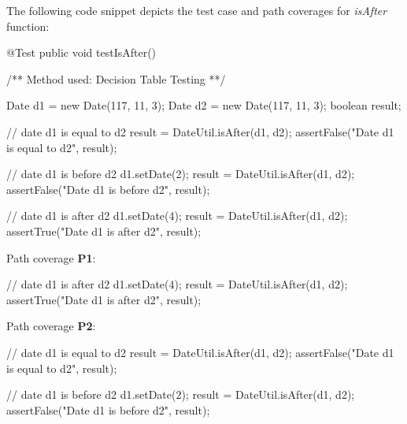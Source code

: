 \documentclass[fontsize=12pt,paper=letter,twoside]{scrartcl}
\begin{document}
\noindent The following code snippet depicts the test case and path coverages for \emph{isAfter} function:
\begin{code}
	@Test
	public void testIsAfter() {
		/** Method used: Decision Table Testing **/
		
		Date d1 = new Date(117, 11, 3);
		Date d2 = new Date(117, 11, 3);
		boolean result;
		
		// date d1 is equal to d2
		result = DateUtil.isAfter(d1, d2);
		assertFalse("Date d1 is equal to d2", result);
		
		// date d1 is before d2
		d1.setDate(2);
		result = DateUtil.isAfter(d1, d2);
		assertFalse("Date d1 is before d2", result);
		
		// date d1 is after d2
		d1.setDate(4);
		result = DateUtil.isAfter(d1, d2);
		assertTrue("Date d1 is after d2", result);
	}
\end{code}

\newpage
\noindent Path coverage \textbf{P1}:
\begin{code}
		// date d1 is after d2
		d1.setDate(4);
		result = DateUtil.isAfter(d1, d2);
		assertTrue("Date d1 is after d2", result);
\end{code}

\noindent Path coverage \textbf{P2}:
\begin{code}
		// date d1 is equal to d2
		result = DateUtil.isAfter(d1, d2);
		assertFalse("Date d1 is equal to d2", result);
		
		// date d1 is before d2
		d1.setDate(2);
		result = DateUtil.isAfter(d1, d2);
		assertFalse("Date d1 is before d2", result);
\end{code}
\end{document}
